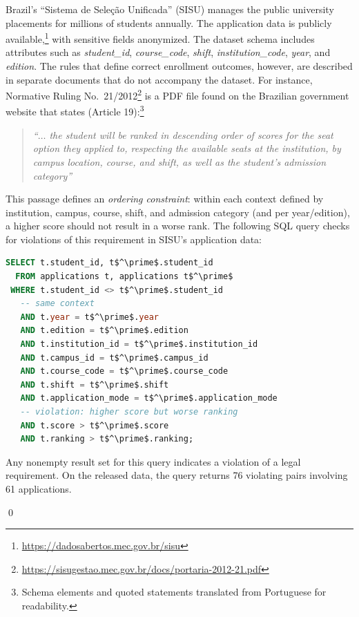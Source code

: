 

\begin{example}
\label{ex:intro}
Brazil's ``Sistema de Sele\c{c}\~{a}o Unificada'' (SISU) manages the public university placements for millions of students annually. The application data is publicly available,\footnote{\url{https://dadosabertos.mec.gov.br/sisu}} with sensitive fields anonymized. The dataset schema includes attributes such as \emph{student\_id}, \emph{course\_code}, \emph{shift}, \emph{institution\_code}, \emph{year}, and \emph{edition}. The rules that define correct enrollment outcomes, however, are described in separate documents that do not accompany the dataset. For instance, Normative Ruling No.\ 21/2012\footnote{\url{https://sisugestao.mec.gov.br/docs/portaria-2012-21.pdf}} is a PDF file found on the Brazilian government website that states (Article 19):\footnote{Schema elements and quoted statements translated from Portuguese for readability.}

\begin{quote}
\textit{``$\ldots$ the student will be ranked in descending order of scores for the seat option they applied to, respecting the available seats at the institution, by campus location, course, and shift, as well as the student's admission category''}
\end{quote}

This passage defines an \emph{ordering constraint}: within each context defined by institution, campus, course, shift, and admission category (and per year/edition), a higher score should not result in a worse rank. The following SQL query checks for violations of this requirement in SISU's application data:

\begin{lstlisting}[language=SQL, frame=none, basicstyle=\footnotesize\ttfamily, mathescape]
SELECT t.student_id, t$^\prime$.student_id
  FROM applications t, applications t$^\prime$
 WHERE t.student_id <> t$^\prime$.student_id
   -- same context
   AND t.year = t$^\prime$.year
   AND t.edition = t$^\prime$.edition
   AND t.institution_id = t$^\prime$.institution_id
   AND t.campus_id = t$^\prime$.campus_id
   AND t.course_code = t$^\prime$.course_code
   AND t.shift = t$^\prime$.shift
   AND t.application_mode = t$^\prime$.application_mode
   -- violation: higher score but worse ranking
   AND t.score > t$^\prime$.score
   AND t.ranking > t$^\prime$.ranking;
\end{lstlisting}

Any nonempty result set for this query indicates a violation of a legal requirement. On the released data, the query returns 76 violating pairs involving 61 applications.


\qed
\end{example}




